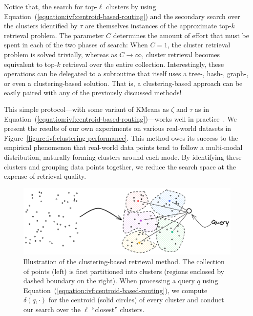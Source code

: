 Notice that, the search for top-$\ell$ clusters by using
Equation~(\ref{equation:ivf:centroid-based-routing})
and the secondary search over the clusters identified by $\tau$ are themselves instances of the approximate
top-$k$ retrieval problem. The parameter $C$ determines the amount of effort that must be spent
in each of the two phases of search: When $C=1$, the cluster retrieval problem is solved trivially,
whereas as $C \rightarrow \infty$, cluster retrieval becomes equivalent to top-$k$ retrieval over the
entire collection.
Interestingly, these operations can be delegated to a
subroutine that itself uses a tree-, hash-, graph-, or even a clustering-based solution.
That is, a clustering-based approach can be easily paired with any of the previously discussed methods!

This simple protocol---with some variant of KMeans as $\zeta$ and $\tau$ as in Equation~(\ref{equation:ivf:centroid-based-routing})---works well in
practice~\citep{auvolat2015clustering,pq,bruch2023bridging,invertedMultiIndex,chierichetti2007clusterPruning}. We present the results of our own experiments on various real-world datasets in
Figure~\ref{figure:ivf:clustering-performance}.
This method owes its success to the empirical phenomenon that real-world data points
tend to follow a multi-modal distribution,
naturally forming clusters around each mode. By identifying these clusters
and grouping data points together, we reduce the search space at the expense of retrieval
quality.

\begin{figure}[t]
    \centering
    \includegraphics[width=0.8\linewidth]{figures/clustering-framework.png}
    \caption{Illustration of the clustering-based retrieval method. The collection of points
    (left) is first partitioned into clusters (regions enclosed by dashed boundary on the right).
    When processing a query $q$
    using Equation~(\ref{equation:ivf:centroid-based-routing}), we compute $\delta(q, \cdot)$ for
    the centroid (solid circles) of every cluster and conduct our search over the $\ell$ ``closest'' clusters.}
    \label{figure:ivf:framework}
\end{figure}

